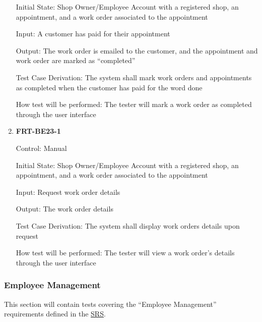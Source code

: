\documentclass[12pt, titlepage]{article}
\begin{document}
\begin{enumerate}
	      Initial State: Shop Owner/Employee Account with a registered shop, an appointment, and a work order
	      associated to the appointment

	      Input: A customer has paid for their appointment

	      Output: The work order is emailed to the customer, and the appointment and work order are marked as
	      ``completed''

	      Test Case Derivation: The system shall mark work orders and appointments as completed when the
	      customer has paid for the word done

	      How test will be performed: The tester will mark a work order as completed through the user
	      interface

	\item \textbf{FRT-BE23-1}

	      Control: Manual

	      Initial State: Shop Owner/Employee Account with a registered shop, an appointment, and a work order
	      associated to the appointment

	      Input: Request work order details

	      Output: The work order details

	      Test Case Derivation: The system shall display work orders details upon request

	      How test will be performed: The tester will view a work order's details through the user interface

\end{enumerate}

\subsubsection{Employee Management}

This section will contain tests covering the ``Employee Management'' requirements defined in the
\href{https://github.com/arkinmodi/project-sayyara/blob/main/docs/SRS/SRS.pdf}{SRS}.
\end{document}
